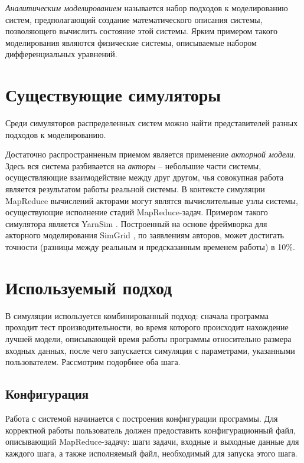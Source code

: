 \documentclass[a4paper,12pt]{article}
\begin{document}
    \textit{Аналитическим моделированием} называется набор подходов к
    моделированию систем, предполагающий создание математического описания
    системы, позволяющего вычислить состояние этой системы. Ярким примером
    такого моделирования являются физические системы, описываемые набором
    дифференциальных уравнений. 


    \section{Существующие симуляторы}

    Среди симуляторов распределенных систем можно найти представителей разных
    подходов к моделированию. 

    Достаточно распространненым приемом является применение \textit{акторной
    модели}. Здесь вся система разбивается на \textit{акторы} -- небольшие части
    системы, осуществляющие взаимодействие между друг другом, чья совокупная
    работа является результатом работы реальной системы. В контексте симуляции
    MapReduce вычислений акторами могут являтся вычислительные узлы системы,
    осуществующие исполнение стадий MapReduce-задач. Примером такого симулятора
    является YarnSim \cite{yarnsim}. Построенный на основе фреймворка для
    акторного моделирования SimGrid \cite{simgrid}, по заявлениям авторов, может
    достигать точности (разницы между реальным и предсказанным временем работы)
    в 10\%. 


    
    \section{Используемый подход}
    
    В симуляции используется комбинированный подход: сначала программа проходит
    тест производительности, во время которого происходит нахождение лучшей
    модели, описывающей время работы программы относительно размера входных
    данных, после чего запускается симуляция с параметрами, указанными
    пользователем. Рассмотрим подорбнее оба шага.

    \subsection{Конфигурация}

    Работа с системой начинается с построения конфигурации программы. Для
    корректной работы пользователь должен предоставить конфигурационный файл,
    описывающий MapReduce-задачу: шаги задачи, входные и выходные данные для
    каждого шага, а также исполняемый файл, необходимый для запуска этого шага. 
\end{document}
